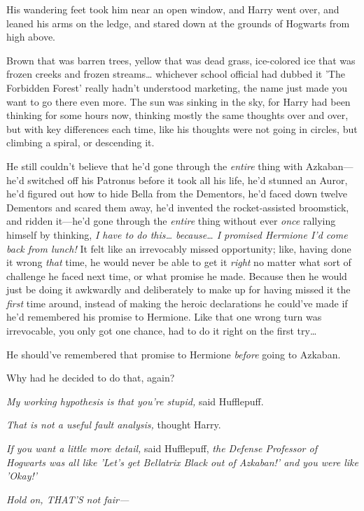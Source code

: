 His wandering feet took him near an open window, and Harry went over, and 
leaned his arms on the ledge, and stared down at the grounds of Hogwarts from 
high above.

Brown that was barren trees, yellow that was dead grass, ice-colored ice that 
was frozen creeks and frozen streams{\ldots} whichever school official had 
dubbed it 'The Forbidden Forest' really hadn't understood marketing, the name 
just made you want to go there even more. The sun was sinking in the sky, for 
Harry had been thinking for some hours now, thinking mostly the same thoughts 
over and over, but with key differences each time, like his thoughts were not 
going in circles, but climbing a spiral, or descending it.

He still couldn't believe that he'd gone through the \emph{entire} thing with 
Azkaban---he'd switched off his Patronus before it took all his life, he'd 
stunned an Auror, he'd figured out how to hide Bella from the Dementors, he'd 
faced down twelve Dementors and scared them away, he'd invented the 
rocket-assisted broomstick, and ridden it---he'd gone through the \emph{entire} 
thing without ever \emph{once} rallying himself by thinking, \emph{I have to do 
this{\ldots} because{\ldots} I promised Hermione I'd come back from lunch!} It 
felt like an irrevocably missed opportunity; like, having done it wrong 
\emph{that} time, he would never be able to get it \emph{right} no matter what 
sort of challenge he faced next time, or what promise he made. Because then he 
would just be doing it awkwardly and deliberately to make up for having missed 
it the \emph{first} time around, instead of making the heroic declarations he 
could've made if he'd remembered his promise to Hermione. Like that one wrong 
turn was irrevocable, you only got one chance, had to do it right on the first 
try{\ldots}

He should've remembered that promise to Hermione \emph{before} going to Azkaban.

Why had he decided to do that, again?

\emph{My working hypothesis is that you're stupid,} said Hufflepuff.

\emph{That is not a useful fault analysis,} thought Harry.

\emph{If you want a little more detail,} said Hufflepuff, \emph{the Defense 
Professor of Hogwarts was all like 'Let's get Bellatrix Black out of Azkaban!' 
and you were like 'Okay!'}

\emph{Hold on, THAT'S not fair---}

